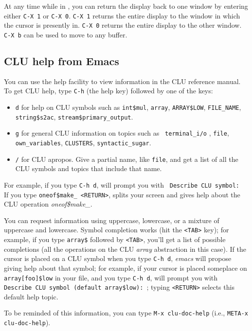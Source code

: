 At any time while in , you can return the display back to one
window by entering either {\tt C-X 1} or {\tt C-X 0}.  {\tt C-X 1} returns the
entire display to the window in which the cursor is presently in.  {\tt C-X 0}
returns the entire display to the other window.  {\tt C-X b} can be used to
move to any buffer.

\subsection{CLU help from Emacs}

You can use the  help facility to view information in the CLU
reference manual.  To get CLU help, type {\tt C-h} (the help key) followed by
one of the keys:
\begin{itemize}
\item  {\tt d} for help on CLU symbols such as
{\tt int\$mul}, {\tt array}, {\tt ARRAY\$LOW}, {\tt FILE\_NAME}, {\tt
string\$s2ac}, {\tt stream\$primary\_output}.
\item  {\tt g} for general CLU information on topics such as {\tt 
terminal\_i/o} , {\tt file}, {\tt own\_variables}, {\tt CLUSTERS},
{\tt syntactic\_sugar}.
\item  {\tt /} for CLU apropos.
Give a partial name, like {\tt file}, and get a list of all the CLU symbols and
topics that include that name.
\end{itemize}

For example, if you type {\tt C-h d},  will prompt you with {\tt
Describe CLU symbol: }  If you type {\tt oneof\$make\_ <RETURN>}, 
splits your screen and gives help about the CLU operation {\it oneof\$make\_}.

You can request information using uppercase, lowercase, or a mixture of
uppercase and lowercase.  Symbol completion works (hit the {\tt <TAB>} key);
for example, if you type {\tt array\$} followed by {\tt <TAB>}, you'll get a
list of possible completions (all the operations on the CLU {\it array}
abstraction in this case).  If the cursor is placed on a CLU symbol when you
type {\tt C-h d}, {\it emacs} will propose giving help about that symbol; for
example, if your cursor is placed someplace on {\tt array[foo]\$low} in your
file, and you type {\tt C-h d},  will prompt you with {\tt
Describe CLU symbol (default array\$low): }; typing {\tt <RETURN>} selects
this default help topic.

To be reminded of this information, you can type {\tt M-x clu-doc-help} (i.e.,
{\tt META-x clu-doc-help}).



